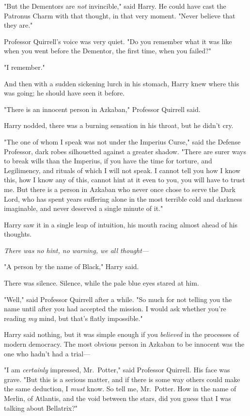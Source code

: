 "But the Dementors are \emph{not} invincible," said Harry. He could have cast
the Patronus Charm with that thought, in that very moment. "Never believe that
they are."

Professor Quirrell's voice was very quiet. "Do you remember what it was like
when you went before the Dementor, the first time, when you failed?"

"I remember."

And then with a sudden sickening lurch in his stomach, Harry knew where this
was going; he should have seen it before.

"There is an innocent person in Azkaban," Professor Quirrell said.

Harry nodded, there was a burning sensation in his throat, but he didn't cry.

"The one of whom I speak was not under the Imperius Curse," said the Defense
Professor, dark robes silhouetted against a greater shadow. "There are surer
ways to break wills than the Imperius, if you have the time for torture, and
Legilimency, and rituals of which I will not speak. I cannot tell you how I
know this, how I know any of this, cannot hint at it even to you, you will have
to trust me. But there is a person in Azkaban who never once chose to serve the
Dark Lord, who has spent years suffering alone in the most terrible cold and
darkness imaginable, and never deserved a single minute of it."

Harry saw it in a single leap of intuition, his mouth racing almost ahead of
his thoughts.

\emph{There was no hint, no warning, we all thought---}

"A person by the name of Black," Harry said.

There was silence. Silence, while the pale blue eyes stared at him.

"Well," said Professor Quirrell after a while. "So much for not telling you the
name until after you had accepted the mission. I would ask whether you're
reading \emph{my} mind, but that's flatly impossible."

Harry said nothing, but it was simple enough if you \emph{believed} in the
processes of modern democracy. The most obvious person in Azkaban to be
innocent was the one who hadn't had a trial---

"I am \emph{certainly} impressed, Mr.~Potter," said Professor Quirrell. His
face was grave. "But this is a serious matter, and if there is some way others
could make the same deduction, I \emph{must} know. So tell me, Mr.~Potter. How
in the name of Merlin, of Atlantis, and the void between the stars, did you
guess that I was talking about Bellatrix?"
